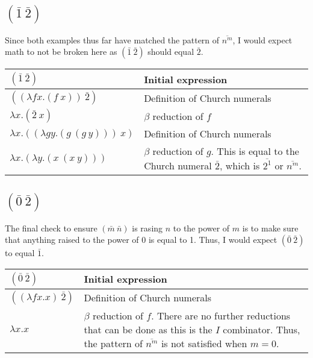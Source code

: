 \documentclass[letterpaper, 10pt, DIV=13]{scrartcl}
\numberwithin{equation}{section}
\numberwithin{figure}{section}
\numberwithin{table}{section}
\begin{document}
\subsection{$(\bar{1}~\bar{2})$}
Since both examples thus far have matched the pattern of $\overline{n^m}$, I would expect math to not be broken here as
$(\bar{1}~\bar{2})$ should equal $\bar{2}$.
\begin{center}
\begin{tabularx}{\textwidth}{|Y|Y|}
    \hline
    $(\bar{1}~\bar{2})$ & Initial expression \\
    \hline
    $((\lambda fx.(f~x))~\bar{2})$ & Definition of Church numerals \\
    \hline
    $\lambda x.(\bar{2}~x)$ & $\beta$ reduction of $f$ \\
    \hline
    $\lambda x.((\lambda gy.(g~(g~y)))~x)$ & Definition of Church numerals \\
    \hline
    $\lambda x.(\lambda y.(x~(x~y)))$ & $\beta$ reduction of $g$. This is equal to
    the Church numeral $\bar{2}$, which is $\overline{2^1}$ or $\overline{n^m}$. \\
    \hline
\end{tabularx}
\end{center}

\subsection{$(\bar{0}~\bar{2})$}
The final check to ensure $(\bar{m}~\bar{n})$ is rasing $n$ to the power of $m$ is to make sure that anything raised
to the power of 0 is equal to 1. Thus, I would expect $(\bar{0}~\bar{2})$ to equal $\bar{1}$.
\begin{center}
\begin{tabularx}{\textwidth}{|Y|Y|}
    \hline
    $(\bar{0}~\bar{2})$ & Initial expression \\
    \hline
    $((\lambda fx.x)~\bar{2})$ & Definition of Church numerals \\
    \hline
    $\lambda x.x$ & $\beta$ reduction of $f$. There are no further reductions that can be done as this is
    the $I$ combinator. Thus, the pattern of $\overline{n^m}$ is not satisfied when $m = 0$.\\
    \hline
\end{tabularx}
\end{center}
\end{document}
